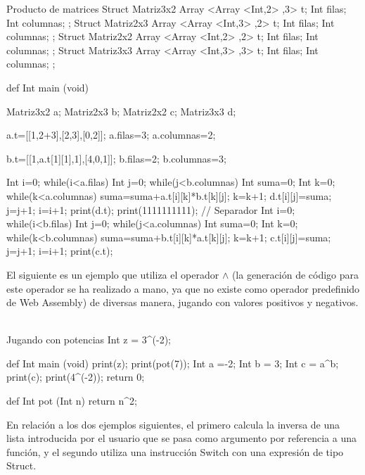 \documentclass[12pt,onecolumn]{article}
\begin{document}
		\begin{wgetlisting}{Producto de matrices}
Struct Matriz3x2{
	Array <Array <Int,2> ,3> t;
	Int filas;
	Int columnas;
};
Struct Matriz2x3{
	Array <Array <Int,3> ,2> t;
	Int filas;
	Int columnas;
};
Struct Matriz2x2{
	Array <Array <Int,2> ,2> t;
	Int filas;
	Int columnas;
};
Struct Matriz3x3{
	Array <Array <Int,3> ,3> t;
	Int filas;
	Int columnas;
};

def Int main (void){

	Matriz3x2 a;
	Matriz2x3 b;
	Matriz2x2 c;
	Matriz3x3 d;
	
	a.t=[[1,2+3],[2,3],[0,2]];
	a.filas=3;
	a.columnas=2;
	
	b.t=[[1,a.t[1][1],1],[4,0,1]];
	b.filas=2;
	b.columnas=3;
	
	Int i=0;
	while(i<a.filas){
		Int j=0;
		while(j<b.columnas){
			Int suma=0;
			Int k=0;
			while(k<a.columnas){
			   suma=suma+a.t[i][k]*b.t[k][j];
			   k=k+1;
			}
			d.t[i][j]=suma;
			j=j+1;
		}
		i=i+1;
	}
	print(d.t);
	print(1111111111);   // Separador
	Int i=0;
	while(i<b.filas){
		Int j=0;
		while(j<a.columnas){
			Int suma=0;
			Int k=0;
			while(k<b.columnas){
			   suma=suma+b.t[i][k]*a.t[k][j];
			   k=k+1;
			}
			c.t[i][j]=suma;
			j=j+1;
		}
		i=i+1;
	}
	print(c.t);
}
		\end{wgetlisting}
		
		\vspace{\baselineskip}
		\vspace{\baselineskip}
		
		El siguiente es un ejemplo que utiliza el operador $\wedge$ (la generación de código para este operador se ha realizado a mano, ya que no existe como operador predefinido de Web Assembly) de diversas manera, jugando con valores positivos y negativos. \\ \\
		
		\begin{wgetlisting}{Jugando con potencias}
Int z = 3^(-2);

def Int main (void){
	print(z);
	print(pot(7));
	Int a =-2;
	Int b = 3;
	Int c = a^b;
	print(c);
	print(4^(-2));
	return 0;
}

def Int pot (Int n) {
       return n^2;
}
		\end{wgetlisting}
		
		\vspace{\baselineskip}
		\vspace{\baselineskip}
		
		En relación a los dos ejemplos siguientes, el primero calcula la inversa de una lista introducida por el usuario que se pasa como argumento por referencia a una función, y el segundo utiliza una instrucción Switch con una expresión de tipo Struct. \\ \\
	
\end{document}
